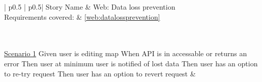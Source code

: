 \begin{longtable}{| p{} | p{}|}
	\hline
	\newline Story Name & \newline Web: Data loss prevention\\\hline
	\newline Requirements covered: & \newline \ref{web:datalossprevention}\\\hline
	\\\hline
	\\\hline
	
	\newline\underline{Scenario 1}\newline
	Given user is editing map\newline
	When API is in accessable or returns an error\newline 
	Then user at minimum user is notified of lost data\newline
	Then user has an option to re-try request\newline
	Then user has an option to revert request\newline
	&
	\\\hline
\end{longtable}

